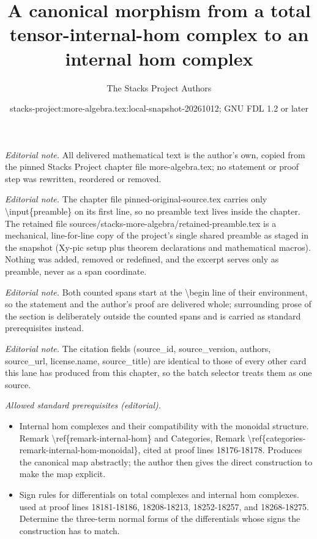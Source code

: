 \documentclass[10pt,a4paper]{amsart}
\title{A canonical morphism from a total tensor-internal-hom complex to an internal hom complex}
\author{The Stacks Project Authors}
\date{stacks-project:more-algebra.tex:local-snapshot-20261012; GNU FDL 1.2 or later}
\theoremstyle{plain}
\theoremstyle{definition}
\theoremstyle{remark}
\numberwithin{equation}{subsection}
\begin{document}
\maketitle
\setcounter{subsection}{1}
\noindent\textit{Editorial note.} All delivered mathematical text is the author's own, copied from the pinned Stacks Project chapter file more-algebra.tex; no statement or proof step was rewritten, reordered or removed.\par\medskip
\noindent\textit{Editorial note.} The chapter file pinned-original-source.tex carries only \textbackslash{}input\{preamble\} on its first line, so no preamble text lives inside the chapter. The retained file sources/stacks-more-algebra/retained-preamble.tex is a mechanical, line-for-line copy of the project's single shared preamble as staged in the snapshot (Xy-pic setup plus theorem declarations and mathematical macros). Nothing was added, removed or redefined, and the excerpt serves only as preamble, never as a span coordinate.\par\medskip
\noindent\textit{Editorial note.} Both counted spans start at the \textbackslash{}begin line of their environment, so the statement and the author's proof are delivered whole; surrounding prose of the section is deliberately outside the counted spans and is carried as standard prerequisites instead.\par\medskip
\noindent\textit{Editorial note.} The citation fields (source\_id, source\_version, authors, source\_url, license.name, source\_title) are identical to those of every other card this lane has produced from this chapter, so the batch selector treats them as one source.\par\medskip
\noindent\textit{Allowed standard prerequisites (editorial).}\begin{itemize}
\item Internal hom complexes and their compatibility with the monoidal structure. Remark \textbackslash{}ref\{remark-internal-hom\} and Categories, Remark \textbackslash{}ref\{categories-remark-internal-hom-monoidal\}, cited at proof lines 18176-18178. Produces the canonical map abstractly; the author then gives the direct construction to make the map explicit.
\item Sign rules for differentials on total complexes and internal hom complexes. used at proof lines 18181-18186, 18208-18213, 18252-18257, and 18268-18275. Determine the three-term normal forms of the differentials whose signs the construction has to match.
\end{itemize}\medskip
\end{document}
